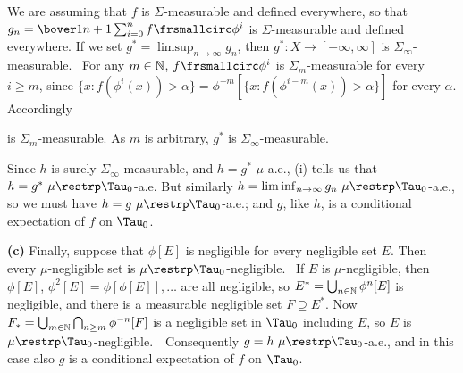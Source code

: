 {\medskip

 We are assuming that $f$ is $\Sigma$-measurable and
defined everywhere, so that
$g_n=\bover1{n+1}\sum_{i=0}^nf\frsmallcirc\phi^i$ is
$\Sigma$-measurable and defined everywhere.   If we set
$g^*=\limsup_{n\to\infty}g_n$, then $g^*:X\to[-\infty,\infty]$ is
$\Sigma_{\infty}$-measurable.   \Prf\ For any $m\in\Bbb N$,
$f\frsmallcirc\phi^i$ is $\Sigma_m$-measurable for every $i\ge m$, since
$\{x:f(\phi^i(x))>\alpha\}=\phi^{-m}[\{x:f(\phi^{i-m}(x))>\alpha\}]$ for
every $\alpha$.   Accordingly


\noindent is $\Sigma_m$-measurable.   As $m$ is arbitrary, $g^*$ is
$\Sigma_{\infty}$-measurable.\   \Qed

Since $h$ is surely $\Sigma_{\infty}$-measurable, and
$h=g^*\,\,\mu$-a.e., (i) tells us that $h=g^*\,\,\mu\restrp\Tau_0$-a.e.
But similarly $h=\liminf_{n\to\infty}g_n\,\,\mu\restrp\Tau_0$-a.e., so
we
must have $h=g\,\,\mu\restrp\Tau_0$-a.e.; and $g$, like $h$, is a
conditional expectation of $f$ on $\Tau_0$.

\medskip

{\bf (c)} Finally, suppose that $\phi[E]$ is negligible for every
negligible set $E$.
Then every $\mu$-negligible set is $\mu\restrp\Tau_0$-negligible.
\Prf\
If $E$ is $\mu$-negligible, then $\phi[E]$,
$\phi^2[E]=\phi[\phi[E]],\ldots$ are all negligible, so
$E^*=\bigcup_{n\in\Bbb N}\phi^n[E]$ is negligible, and there is a
measurable negligible set $F\supseteq E^*$.   Now $F_*=\bigcup_{m\in\Bbb
N}\bigcap_{n\ge m}\phi^{-n}[F]$ is a negligible set in $\Tau_0$
including $E$, so $E$ is $\mu\restrp\Tau_0$-negligible.\ \Qed\
Consequently $g=h\,\,\mu\restrp\Tau_0$-a.e., and in this case also $g$
is a conditional expectation of $f$ on $\Tau_0$.
}%


